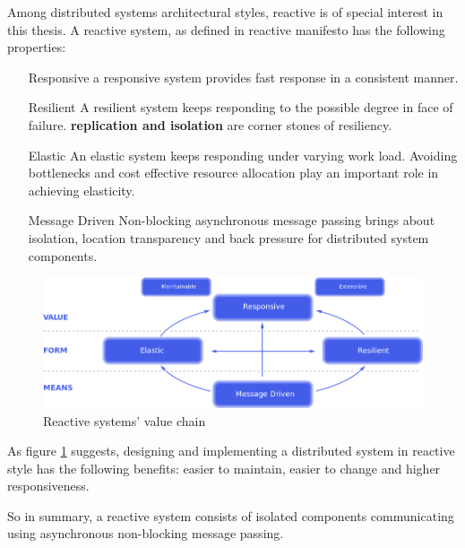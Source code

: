 \documentclass[a4]{report}
\begin{document}
        Among distributed systems architectural styles, reactive is of special interest in this thesis.
        A reactive system, as defined in reactive manifesto \cite{reactive-manifesto} has the following properties:
        \begin{itemize}
            \item[Responsive] a responsive system provides fast response in a consistent manner.
            \item[Resilient] A resilient system keeps responding to the possible degree in face of failure.
            \textbf{replication and isolation} are corner stones of resiliency.
            \item[Elastic] An elastic system keeps responding under varying work load. Avoiding bottlenecks and cost
            effective resource allocation play an important role in achieving elasticity.
            \item[Message Driven] Non-blocking asynchronous message passing brings about isolation, location
            transparency and back pressure for distributed system components.
        \end{itemize}

        \begin{figure}[ht]
            \caption{Reactive systems' value chain \cite{reactive-manifesto}}
            \label{fig:reactive-value}
            \includegraphics[scale=0.4]{images/reactive-traits.png}
        \end{figure}


        As figure \ref{fig:reactive-value} suggests, designing and implementing a distributed system in reactive style
        has the following benefits: easier to maintain, easier to change and higher responsiveness.

        So in summary, a reactive system consists of isolated components communicating using asynchronous non-blocking message passing.
\end{document}
